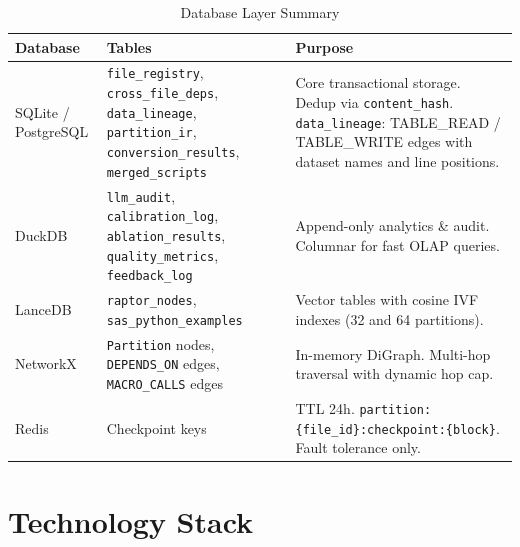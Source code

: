 \documentclass[11pt,a4paper]{article}
\begin{document}
\begin{table}[H]
\centering
\caption{Database Layer Summary}
\renewcommand{\arraystretch}{1.3}
\small
\begin{tabularx}{\textwidth}{@{} l l X @{}}
\toprule
\textbf{Database} & \textbf{Tables} & \textbf{Purpose} \\
\midrule
SQLite / PostgreSQL & \texttt{file\_registry}, \texttt{cross\_file\_deps}, \texttt{data\_lineage}, \texttt{partition\_ir}, \texttt{conversion\_results}, \texttt{merged\_scripts} & Core transactional storage. Dedup via \texttt{content\_hash}. \texttt{data\_lineage}: TABLE\_READ / TABLE\_WRITE edges with dataset names and line positions. \\
\addlinespace
DuckDB & \texttt{llm\_audit}, \texttt{calibration\_log}, \texttt{ablation\_results}, \texttt{quality\_metrics}, \texttt{feedback\_log} & Append-only analytics \& audit. Columnar for fast OLAP queries. \\
\addlinespace
LanceDB & \texttt{raptor\_nodes}, \texttt{sas\_python\_examples} & Vector tables with cosine IVF indexes (32 and 64 partitions). \\
\addlinespace
NetworkX & \texttt{Partition} nodes, \texttt{DEPENDS\_ON} edges, \texttt{MACRO\_CALLS} edges & In-memory DiGraph. Multi-hop traversal with dynamic hop cap. \\
\addlinespace
Redis & Checkpoint keys & TTL 24h. \texttt{partition:\{file\_id\}:checkpoint:\{block\}}. Fault tolerance only. \\
\bottomrule
\end{tabularx}
\end{table}


\section{Technology Stack}
\end{document}
